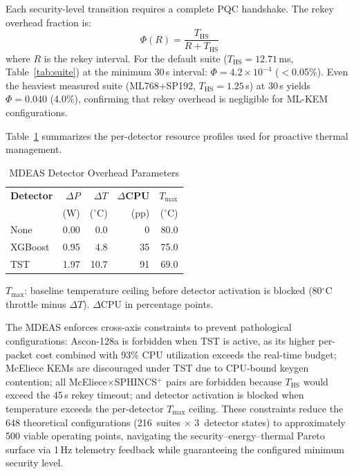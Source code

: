 Each security-level transition requires a complete PQC handshake.
The rekey overhead fraction is:
\begin{equation}
\Phi(R) = \frac{T_\text{HS}}{R + T_\text{HS}}
\label{eq:rekey}
\end{equation}
where $R$ is the rekey interval.  For the default suite ($T_\text{HS} =
12.71$\,ms, Table~\ref{tab:suite}) at the minimum 30\,s interval:
$\Phi = 4.2 \times 10^{-4}$ ($<$0.05\%).  Even the heaviest measured
suite (ML768+SP192, $T_\text{HS} = 1.25$\,s) at 30\,s yields
$\Phi = 0.040$ (4.0\%), confirming that rekey overhead is negligible
for ML-KEM configurations.

Table~\ref{tab:detector_overhead} summarizes the per-detector resource
profiles used for proactive thermal management.

\begin{table}[t]
\centering
\caption{MDEAS Detector Overhead Parameters}
\label{tab:detector_overhead}
\footnotesize
\begin{tabular}{@{}lrrrr@{}}
\toprule
\textbf{Detector} &
  \textbf{$\Delta P$} & \textbf{$\Delta T$} &
  \textbf{$\Delta$CPU} & \textbf{$T_\text{max}$} \\
& (W) & ($^\circ$C) & (pp) & ($^\circ$C) \\
\midrule
None    & 0.00 & 0.0  & 0  & 80.0 \\
XGBoost & 0.95 & 4.8  & 35 & 75.0 \\
TST     & 1.97 & 10.7 & 91 & 69.0 \\
\bottomrule
\end{tabular}
\begin{tablenotes}
\footnotesize
\item $T_\text{max}$: baseline temperature ceiling before detector
  activation is blocked (80$^\circ$C throttle minus $\Delta T$).
  $\Delta$CPU in percentage points.
\end{tablenotes}
\end{table}

The MDEAS enforces cross-axis constraints to prevent pathological
configurations: Ascon-128a is forbidden when TST is active, as its
higher per-packet cost combined with 93\% CPU utilization exceeds the
real-time budget; McEliece KEMs are discouraged under TST due to
CPU-bound keygen contention; all McEliece$\times$SPHINCS$^+$ pairs are
forbidden because $T_\text{HS}$ would exceed the 45\,s rekey timeout;
and detector activation is blocked when temperature exceeds the
per-detector $T_\text{max}$ ceiling.  These constraints reduce the 648
theoretical configurations (216~suites $\times$ 3~detector states) to
approximately 500 viable operating points, navigating the
security--energy--thermal Pareto surface via 1\,Hz telemetry feedback
while guaranteeing the configured minimum security level.
